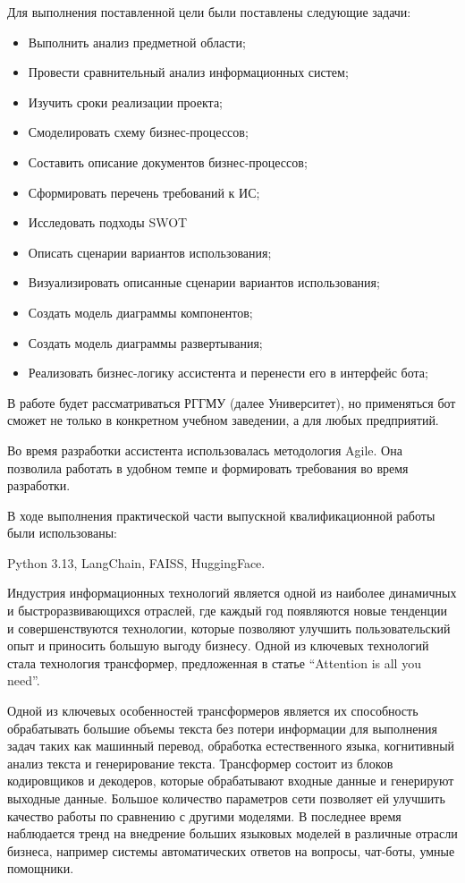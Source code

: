 Для выполнения поставленной цели были поставлены следующие задачи:
\begin{itemize}
    \item Выполнить анализ предметной области;
    \item Провести сравнительный анализ информационных систем;
    \item Изучить сроки реализации проекта;
    \item Смоделировать схему бизнес-процессов;
    \item Составить описание документов бизнес-процессов;
    \item Сформировать перечень требований к ИС;
    \item Исследовать подходы SWOT
    \item Описать сценарии вариантов использования;
    \item Визуализировать описанные сценарии вариантов использования;
    \item Создать модель диаграммы компонентов;
    \item Создать модель диаграммы развертывания;
    \item Реализовать бизнес-логику ассистента и перенести его в интерфейс бота;
\end{itemize}

В работе будет рассматриваться РГГМУ (далее Университет), но применяться бот
сможет не только в конкретном учебном заведении, а для любых предприятий.

Во время разработки ассистента использовалась методология Agile. Она позволила
работать в удобном темпе и формировать требования во время разработки.

В ходе выполнения практической части выпускной квалификационной
работы были использованы:

Python 3.13, LangChain, FAISS, HuggingFace.


Индустрия информационных технологий является одной из наиболее динамичных и 
быстроразвивающихся отраслей, где каждый год появляются новые тенденции и
совершенствуются технологии, которые позволяют улучшить пользовательский опыт 
и приносить большую выгоду бизнесу. Одной из ключевых технологий стала 
технология трансформер, предложенная в статье “Attention is all you need”.

Одной из ключевых особенностей трансформеров является их способность 
обрабатывать большие объемы текста без потери информации для выполнения задач
таких как машинный перевод, обработка естественного языка, когнитивный анализ
текста и генерирование текста. Трансформер состоит из блоков кодировщиков и
декодеров, которые обрабатывают входные данные и генерируют выходные данные.
Большое количество параметров сети позволяет ей улучшить качество работы по 
сравнению с другими моделями. В последнее время наблюдается тренд
на внедрение больших языковых моделей в различные отрасли бизнеса, например
системы автоматических ответов на вопросы, чат-боты, умные помощники. 

